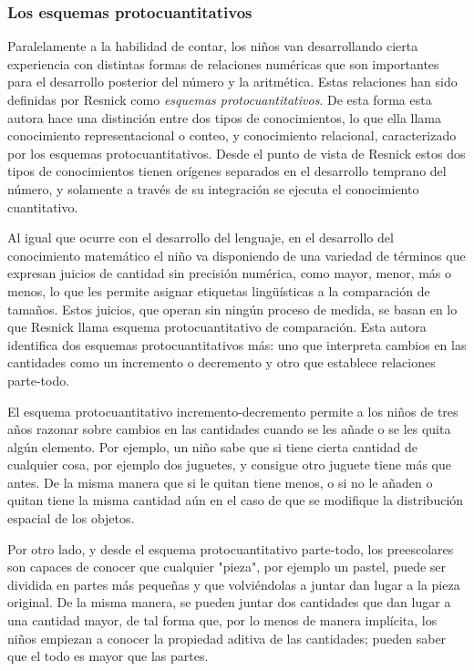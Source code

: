 \documentclass{article}
\begin{document}
\subsubsection{Los esquemas protocuantitativos}
Paralelamente a la habilidad de contar, los niños van desarrollando cierta experiencia con distintas formas de relaciones numéricas que son importantes para el desarrollo posterior del número y la aritmética. Estas relaciones han sido definidas por Resnick \cite{resnick2020protoquantities,resnick1989developing} como \emph{esquemas protocuantitativos}. De esta forma esta autora hace una distinción entre dos tipos de conocimientos, lo que ella llama conocimiento representacional o conteo, y conocimiento relacional, caracterizado por los esquemas protocuantitativos. Desde el punto de vista de Resnick \cite{resnick2020protoquantities,resnick1989developing} estos dos tipos de conocimientos tienen orígenes separados en el desarrollo temprano del número, y solamente a través de su integración se ejecuta el conocimiento cuantitativo.

Al igual que ocurre con el desarrollo del lenguaje, en el desarrollo del conocimiento matemático el niño va disponiendo de una variedad de términos que expresan juicios de cantidad sin precisión numérica, como mayor, menor, más o menos, lo que les permite asignar etiquetas lingüísticas a la comparación de tamaños. Estos juicios, que operan sin ningún proceso de medida, se basan en lo que Resnick  \cite{resnick2020protoquantities,resnick1989developing} llama esquema protocuantitativo de comparación. Esta autora identifica dos esquemas protocuantitativos más: uno que interpreta cambios en las cantidades como un incremento o decremento y otro que establece relaciones parte-todo.

El esquema protocuantitativo incremento-decremento permite a los niños de tres años razonar sobre cambios en las cantidades cuando se les añade o se les quita algún elemento. Por ejemplo, un niño sabe que si tiene cierta cantidad de cualquier cosa, por ejemplo dos juguetes, y consigue otro juguete tiene más que antes. De la misma manera que si le quitan tiene menos, o si no le añaden o quitan tiene la misma cantidad aún en el caso de que se modifique la distribución espacial de los objetos.

Por otro lado, y desde el esquema protocuantitativo parte-todo, los preescolares son capaces de conocer que cualquier "pieza", por ejemplo un pastel, puede ser dividida en partes más pequeñas y que volviéndolas a juntar dan lugar a la pieza original. De la misma manera, se pueden juntar dos cantidades que dan lugar a una cantidad mayor, de tal forma que, por lo menos de manera implícita, los niños empiezan a conocer la propiedad aditiva de las cantidades; pueden saber que el todo es mayor que las partes.
\end{document}
